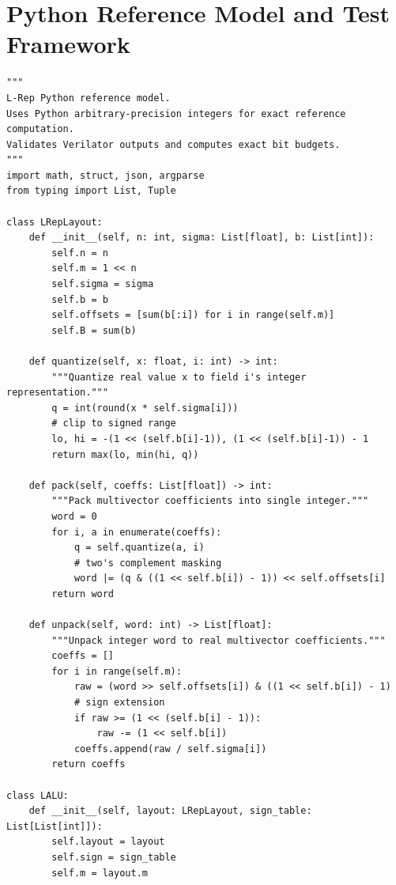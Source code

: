 \documentclass[11pt,a4paper]{article}
\theoremstyle{definition}
\theoremstyle{plain}
\theoremstyle{remark}
\begin{document}
\section{Python Reference Model and Test Framework}
\label{app:sim}

\begin{lstlisting}[caption={Complete Python reference model for L-Rep validation},label=lst:python]
"""
L-Rep Python reference model.
Uses Python arbitrary-precision integers for exact reference computation.
Validates Verilator outputs and computes exact bit budgets.
"""
import math, struct, json, argparse
from typing import List, Tuple

class LRepLayout:
    def __init__(self, n: int, sigma: List[float], b: List[int]):
        self.n = n
        self.m = 1 << n
        self.sigma = sigma
        self.b = b
        self.offsets = [sum(b[:i]) for i in range(self.m)]
        self.B = sum(b)
    
    def quantize(self, x: float, i: int) -> int:
        """Quantize real value x to field i's integer representation."""
        q = int(round(x * self.sigma[i]))
        # clip to signed range
        lo, hi = -(1 << (self.b[i]-1)), (1 << (self.b[i]-1)) - 1
        return max(lo, min(hi, q))
    
    def pack(self, coeffs: List[float]) -> int:
        """Pack multivector coefficients into single integer."""
        word = 0
        for i, a in enumerate(coeffs):
            q = self.quantize(a, i)
            # two's complement masking
            word |= (q & ((1 << self.b[i]) - 1)) << self.offsets[i]
        return word
    
    def unpack(self, word: int) -> List[float]:
        """Unpack integer word to real multivector coefficients."""
        coeffs = []
        for i in range(self.m):
            raw = (word >> self.offsets[i]) & ((1 << self.b[i]) - 1)
            # sign extension
            if raw >= (1 << (self.b[i] - 1)):
                raw -= (1 << self.b[i])
            coeffs.append(raw / self.sigma[i])
        return coeffs

class LALU:
    def __init__(self, layout: LRepLayout, sign_table: List[List[int]]):
        self.layout = layout
        self.sign = sign_table
        self.m = layout.m
    

\end{lstlisting}
\end{document}
